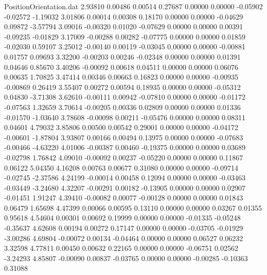 \begin{filecontents}{PositionOrientation.dat}
   2.93810    0.00486    0.00514     0.27687    0.00000    0.00000   -0.05902   -0.02572   -1.19032
   3.01806    0.00014    0.00308     0.18170    0.00000    0.00000   -0.04629    0.09872   -3.57794
   3.09016   -0.00320    0.01020    -0.07629    0.00000    0.00000    0.00391   -0.09235   -0.01829
   3.17009   -0.00288    0.00282    -0.07775    0.00000    0.00000    0.01859   -0.02030    0.59107
   3.25012   -0.00140    0.00119    -0.03045    0.00000    0.00000   -0.00881    0.01757    0.09693
   3.32200   -0.00203    0.00246    -0.02348    0.00000    0.00000    0.01391    0.04646    0.85670
   3.40206   -0.00092    0.00618     0.04511    0.00000    0.00000    0.06076    0.00635    1.70825
   3.47414    0.00346    0.00663     0.16823    0.00000    0.00000   -0.00935   -0.00869    0.26419
   3.55407    0.00272    0.00594     0.18935    0.00000    0.00000   -0.05312    0.04830   -3.71308
   3.62610   -0.00111    0.00942    -0.07810    0.00000    0.00000   -0.01172   -0.07563    1.32659
   3.70614   -0.00205    0.00336     0.02809    0.00000    0.00000    0.01336   -0.01570   -1.03640
   3.78608   -0.00098    0.00211    -0.05476    0.00000    0.00000    0.08311    0.04601    4.79032
   3.85806    0.00500    0.00542     0.29001    0.00000    0.00000   -0.04172   -0.00601   -1.87804
   3.93807    0.00166    0.00494     0.13975    0.00000    0.00000   -0.07683   -0.00466   -4.63220
   4.01006   -0.00387    0.00460    -0.19375    0.00000    0.00000    0.03689   -0.02798    1.76842
   4.09010   -0.00092    0.00237    -0.05220    0.00000    0.00000    0.11867    0.06122    5.04350
   4.16208    0.00763    0.00677     0.31080    0.00000    0.00000   -0.09714   -0.02745   -2.37586
   4.24199   -0.00014    0.00458     0.12094    0.00000    0.00000   -0.03463   -0.03449   -3.24680
   4.32207   -0.00291    0.00182    -0.13905    0.00000    0.00000    0.02907   -0.01451    1.91247
   4.39410   -0.00082    0.00077    -0.00128    0.00000    0.00000    0.01843    0.06479    1.65698
   4.47399    0.00066    0.00595     0.13110    0.00000    0.00000    0.03267    0.01355    0.95618
   4.54604    0.00301    0.00692     0.19999    0.00000    0.00000   -0.01335   -0.05248   -0.35637
   4.62608    0.00194    0.00272     0.17147    0.00000    0.00000   -0.03705   -0.01929   -3.00286
   4.69804   -0.00072    0.00134    -0.04464    0.00000    0.00000    0.06527    0.06232    3.32598
   4.77811    0.00450    0.00632     0.22165    0.00000    0.00000   -0.06751    0.02562   -3.24293
   4.85807   -0.00090    0.00837    -0.03765    0.00000    0.00000   -0.00285   -0.10363    0.31088

\end{filecontents}
